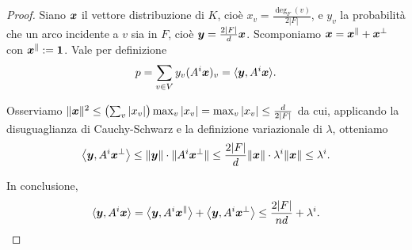 \begin{proof}
	Siano $\bm{x}$ il vettore distribuzione di $K$, cioè $x_v = \frac{\deg_F(v)}
	{2 |F|}$, e $y_v$ la probabilità che un arco incidente a $v$ sia in $F$, cioè
	$\bm{y} = \frac{2 |F|}{d} \bm{x}$.
	Scomponiamo $\bm{x} = \bm{x}^\parallel + \bm{x}^\perp$ con
	$\bm{x}^\parallel := \bm{1}$. Vale per definizione
	\[
		p = \sum_{v \in V}{ y_v (A^i \bm{x})_v }
		  = \langle \bm{y}, A^i \bm{x} \rangle.
	\]

	Osserviamo $\lVert\bm{x}\rVert^2 \le \bigl(\sum_v{\lvert x_v \rvert} \bigr)
	\max_v{ \lvert x_v \rvert } = \max_v{ \lvert x_v \rvert }
	\le \frac{d}{2 | F |}$ da cui, applicando la disuguaglianza di Cauchy-Schwarz
	e la definizione variazionale di $\lambda$, otteniamo
	\[
		\bigl\langle \bm{y}, A^i \bm{x}^\perp \bigr\rangle
		\le \lVert\bm{y}\rVert \cdot \lVert A^i \bm{x}^\perp\rVert
		\le \frac{2 |F|}{d} \lVert\bm{x}\rVert \cdot \lambda^i \lVert\bm{x}\rVert
		\le \lambda^i.
	\]

	In conclusione,
	\[
		\langle \bm{y}, A^i \bm{x} \rangle
		= \bigl\langle \bm{y}, A^i \bm{x}^\parallel \bigr\rangle
		+ \bigl\langle \bm{y}, A^i \bm{x}^\perp \bigr\rangle
		\le \frac{2 \lvert F \rvert}{n d} + \lambda^i.
	\]
\end{proof}

